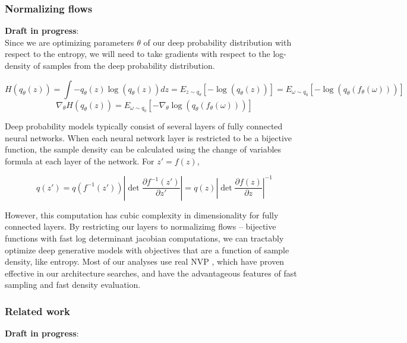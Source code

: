 \documentclass[11pt]{article}
\begin{document}
\subsubsection{Normalizing flows}\label{methods_NF}
\textbf{Draft in progress}: \\
Since we are optimizing parameters $\theta$ of our deep probability distribution with respect to the entropy, we will need to take gradients with respect to the log-density of samples from the deep probability distribution.

\begin{equation}
H(q_\theta(z)) = \int - q_\theta(z) \log(q_\theta(z)) dz = E_{z \sim q_\theta}\left[-\log(q_\theta(z)) \right] = E_{\omega \sim q_0}\left[-\log(q_\theta(f_\theta(\omega))) \right]
\end{equation}
\begin{equation}
\nabla_\theta H(q_\theta(z)) = E_{\omega \sim q_0}\left[- \nabla_\theta \log(q_\theta(f_\theta(\omega))) \right]
\end{equation}

Deep probability models typically consist of several layers of fully connected neural networks.  When each neural network layer is restricted to be a bijective function, the sample density can be calculated using the change of variables formula at each layer of the network.  For $z' = f(z)$,

\begin{equation}
q(z') = q(f^{-1}(z')) \left| \det \frac{\partial f^{-1}(z')}{\partial z'} \right| = q(z) \left| \det \frac{\partial f(z)}{\partial z} \right|^{-1}
\end{equation}

However, this computation has cubic complexity in dimensionality for fully connected layers.  By restricting our layers to normalizimg flows \cite{rezende2015variational} -- bijective functions with fast log determinant jacobian computations, we can tractably optimize deep generative models with objectives that are a function of sample density, like entropy. Most of our analyses use real NVP \cite{dinh2017density}, which have proven effective in our architecture searches, and have the advantageous features of fast sampling and fast density evaluation.

\subsubsection{Related work}\label{methods_related_work}
\textbf{Draft in progress}: \\
\end{document}
